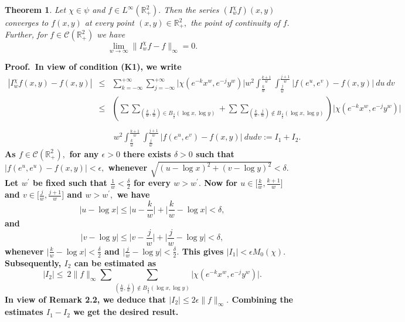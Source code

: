 \documentclass[12pt]{article}
\newtheorem{thm}{Theorem}[section]
\begin{document}
{\begin{thm}\label{theorem1}
Let $\chi \in \psi$ and $ f\in  L^{\infty}(\mathbb{R}^{2}_{+}).$ Then the series $(I^{\chi}_{w} f)(x,y)$ converges to $f(x,y)$ at every point $(x,y) \in \mathbb{R}^{2}_{+},$ the point of continuity of $f.$ Further, for $f \in \mathcal{C}(\mathbb{R}^{2}_{+})$ we have
$$ \lim_{w \rightarrow \infty} \|I_{w}^{\chi}f - f \|_{\infty} = 0.$$
\end{thm}

\noindent\bf{Proof.}\rm \
In view of condition (K1), we write
\begin{eqnarray*}
|I_{w}^{\chi}f(x,y)-f(x,y)|
&\leq& \sum_{k= - \infty}^{+\infty} \sum_{j= - \infty}^{+\infty}\bigg|\chi(e^{-k} x^{w},e^{-j} y^{w})\bigg|w^{2} \int_{\frac{k}{w}}^{\frac{k+1}{w}}\int_{\frac{j}{w}}^{\frac{j+1}{w}}|f(e^{u},e^{v}) - f(x,y)|\ du\  dv \\
&\leq& \left( \sum \sum_{(\frac{k}{w},\frac{j}{w}) \in B_{\frac{\delta}{2}}(\log x,\log y)} + \sum \sum_{(\frac{k}{w},\frac{j}{w}) \notin B_{\frac{\delta}{2}}(\log x,\log y)} \right) \big| \chi(e^{-k} x^{w},e^{-j} y^{w})\big|\\
\\&& \ w^{2} \int_{\frac{k}{w}}^{\frac{k+1}{w}}\int_{\frac{j}{w}}^{\frac{j+1}{w}} |f(e^{u},e^{v}) - f(x,y)| \ dudv
:=I_{1}+I_{2}.
\end{eqnarray*}
As $f \in \mathcal{C}(\mathbb{R}^{2}_{+}),$ for any $ \epsilon >0$ there exists $\delta>0$ such that $ |f(e^{u},e^{u}) - f(x,y)|< \epsilon,$ whenever $\sqrt{(u- \log x)^{2}+(v- \log y)^{2}} < \delta.$
Let $w^{'}$ be fixed such that $ \frac{1}{w}< \frac{\delta}{2} $ for every $ w > w^{'}.$ Now for  $ u \in\big[ \frac{k}{w}, \frac{k+1}{w} \big]$ and $ v \in\big[ \frac{j}{w}, \frac{j+1}{w} \big]$ and $ w > w^{'},$ we have
$$ |u- \log x| \leq \Big | u - \frac{k}{w} \Big|+\Big |\frac{k}{w} - \log x \Big| < \delta,$$
and $$ |v- \log y| \leq \Big | v - \frac{j}{w} \Big|+\Big |\frac{j}{w} - \log y \Big| < \delta,$$
whenever $ \big|\frac{k}{w} - \log x\big|< \frac{\delta}{2}$ and $ \big|\frac{j}{w} - \log y\big|< \frac{\delta}{2}.$
This gives $|I_{1}| < \epsilon M_{0}(\chi).$ Subsequently,  $I_{2}$ can be estimated as
$$ |I_{2}| \leq \ 2 \|f\|_{\infty} \sum \sum_{(\frac{k}{w},\frac{j}{w}) \notin B_{\frac{\delta}{2}}(\log x,\log y)} \big| \chi(e^{-k} x^{w},e^{-j} y^{w})\big|.$$
In view of Remark 2.2, we deduce that $|I_{2}|\leq 2 \epsilon \|f\|_{\infty}.$ Combining the estimates $I_{1}-I_{2}$ we get the desired result.

}
\end{document}
